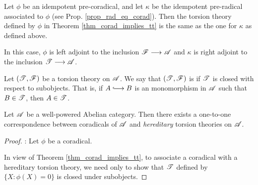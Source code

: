 \begin{cor}
Let $\phi$ be an idempotent pre-coradical, and let $\kappa$ be the 
idempotent pre-radical associated to $\phi$ (see Prop. 
\ref{prop_rad_eq_corad}). Then the torsion theory defined by $\phi$
in Theorem \ref{thm_corad_implies_tt} is the same as the one for
$\kappa$ as defined above.

In this case, $\phi$ is left adjoint to the inclusion $\mathscr{F} \longrightarrow 
\mathscr{A}$ and $\kappa$ is right adjoint to the inclusion $\mathscr{T} 
\longrightarrow \mathscr{A}$.
\end{cor}

\begin{defn}
Let $(\mathscr{T}, \mathscr{F})$ be a torsion theory on $\mathscr{A}$. We say 
that $(\mathscr{T}, \mathscr{F})$ is  if $\mathscr{T}$ is 
closed with respect to subobjects. That is, if $A \into B$ is an 
monomorphism in $\mathscr{A}$ such that $B \in \mathscr{T}$, then $A \in 
\mathscr{T}$.
\end{defn}

\begin{thm}\label{thm_corad_equiv_htt}
Let $\mathscr{A}$ be a well-powered Abelian category. Then there 
exists a one-to-one correspondence between coradicals of $\mathscr{A}$ 
and \emph{hereditary} torsion theories on $\mathscr{A}$.
\end{thm}
\begin{proof}

 : Let 
$\phi$ be a coradical.

In view of Theorem \ref{thm_corad_implies_tt}, to associate a 
coradical with a hereditary torsion theory, we need only to show
that $\mathscr{T}$ defined by $\{X : \phi(X) = 0\}$ is closed under
subobjects.
\end{proof}
